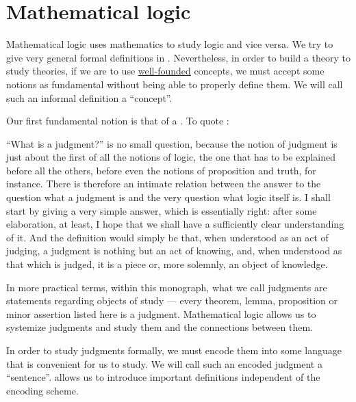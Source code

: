 \section{Mathematical logic}\label{sec:mathematical_logic}

Mathematical logic uses mathematics to study logic and vice versa. We try to give very general formal definitions in . Nevertheless, in order to build a theory to study theories, if we are to use \hyperref[def:well_founded_relation]{well-founded} concepts, we must accept some notions as fundamental without being able to properly define them. We will call such an informal definition a \enquote{concept}.

\begin{concept}\label{con:judgment}
  Our first fundamental notion is that of a . To quote :
  \begin{displayquote}
    \enquote{What is a judgment?} is no small question, because the notion of judgment is just about the first of all the notions of logic, the one that has to be explained before all the others, before even the notions of proposition and truth, for instance. There is therefore an intimate relation between the answer to the question what a judgment is and the very question what logic itself is. I shall start by giving a very simple answer, which is essentially right: after some elaboration, at least, I hope that we shall have a sufficiently clear understanding of it. And the definition would simply be that, when understood as an act of judging, a judgment is nothing but an act of knowing, and, when understood as that which is judged, it is a piece or, more solemnly, an object of knowledge.
  \end{displayquote}
\end{concept}
\begin{comments}
  \item In more practical terms, within this monograph, what we call judgments are statements regarding objects of study --- every theorem, lemma, proposition or minor assertion listed here is a judgment. Mathematical logic allows us to systemize judgments and study them and the connections between them.

  \item In order to study judgments formally, we must encode them into some language that is convenient for us to study. We will call such an encoded judgment a \enquote{sentence}.  allows us to introduce important definitions independent of the encoding scheme.
\end{comments}


